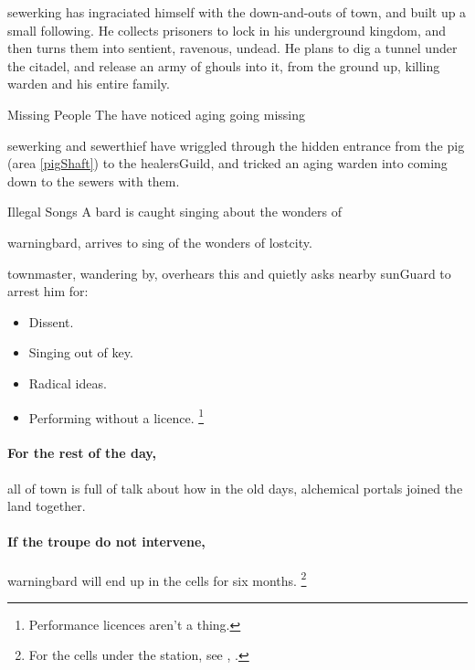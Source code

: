 \label{sewerking}

\noindent
\Gls{sewerking} has ingraciated himself with the down-and-outs of \gls{town}, and built up a small following.
He collects prisoners to lock in his underground kingdom, and then turns them into sentient, ravenous, undead.%
He plans to dig a tunnel under the citadel, and release an army of ghouls into it, from the ground up, killing \gls{warden} and his entire family.

  {Missing People}%
  {The  have noticed aging  going missing}%

\Gls{sewerking} and \gls{sewerthief} have wriggled through the hidden entrance from the \gls{pig} (area \vref{pigShaft}) to the \gls{healersGuild}, and tricked an aging \gls{warden} into coming down to the sewers with them.

{Illegal Songs}%
{A bard is caught singing about the wonders of }%

\Gls{warningbard}, arrives to sing of the wonders of \gls{lostcity}.

\Gls{townmaster}, wandering by, overhears this and quietly asks nearby \gls{sunGuard} to arrest him for:


\begin{itemize}
  \item
  Dissent.
  \item
  Singing out of key.
  \item
  Radical ideas.
  \item
  Performing without a licence.%
  \footnote{Performance licences aren't a thing.}
\end{itemize}

\paragraph{For the rest of the day,}
all of \gls{town} is full of talk about how in the old days, alchemical portals joined the land together.

\paragraph{If the troupe do not intervene,}
\gls{warningbard} will end up in the cells for six months.
\footnote{For the cells under the  station, see , .}

